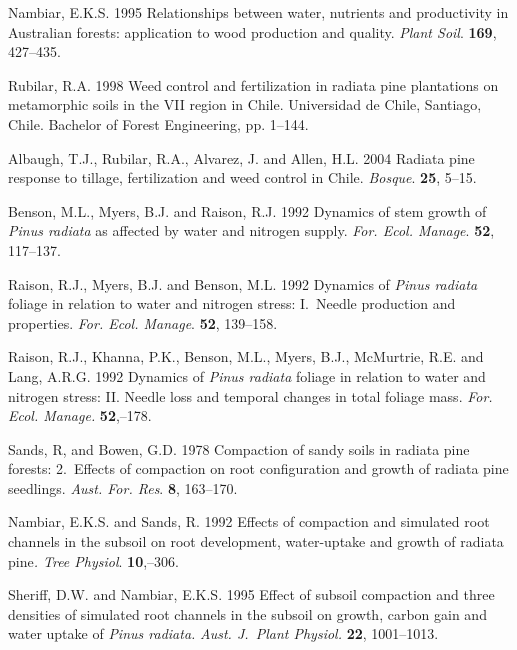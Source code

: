 \documentclass[final]{foresj}
\begin{document}
\begin{thebibliography}
Nambiar, E.K.S. 1995 Relationships between water, nutrients
and productivity in Australian forests: application to wood
production and quality. \textit{Plant Soil}. \textbf{169},
427--435.

Rubilar, R.A. 1998 Weed control and fertilization in
radiata pine plantations on metamorphic soils in the VII
region in Chile. Universidad de Chile, Santiago, Chile.
Bachelor of Forest Engineering, pp. 1--144.

Albaugh, T.J., Rubilar, R.A., Alvarez, J. and Allen, H.L.
2004 Radiata pine response to tillage, fertilization and
weed control in Chile. \textit{Bosque}. \textbf{25}, \hbox{5--15}.

Benson, M.L., Myers, B.J. and Raison, R.J. 1992 Dynamics of
stem growth of \textit{Pinus radiata} as affected by water
and nitrogen supply. \textit{For. Ecol. Manage}.
\textbf{52}, 117--137.


Raison, R.J., Myers, B.J. and Benson, M.L. 1992
Dynamics of \textit{Pinus radiata} foliage in relation to
water and nitrogen stress: I.~Needle production and
properties. \textit{For. Ecol. Manage}. \textbf{52},
139--158.

Raison, R.J., Khanna, P.K., Benson, M.L., Myers, B.J.,
McMurtrie, R.E. and Lang, A.R.G. 1992 Dynamics of
\textit{Pinus radiata} foliage in relation to water and
nitrogen stress: II. Needle loss and temporal changes in
total foliage mass. \textit{For. Ecol. Manage.}
\textbf{52},--178.


Sands, R, and Bowen, G.D. 1978 Compaction of sandy soils in
radiata pine forests: 2.~Effects of compaction on root
configuration and growth of radiata pine seedlings.
\textit{Aust. For. Res}. \textbf{8}, 163--170.

Nambiar, E.K.S. and Sands, R. 1992 Effects of compaction
and simulated root channels in the subsoil on root
development, water-uptake and growth of radiata
pine\textit{. Tree Physiol}. \textbf{10},--306.

Sheriff, D.W. and Nambiar, E.K.S. 1995 Effect of subsoil
compaction and three densities of simulated root channels
in the subsoil on growth, carbon gain and water uptake of
\textit{Pinus radiata.} \textit{Aust. J.~Plant Physiol.}
\textbf{22}, 1001--1013.


\end{thebibliography}
\end{document}
